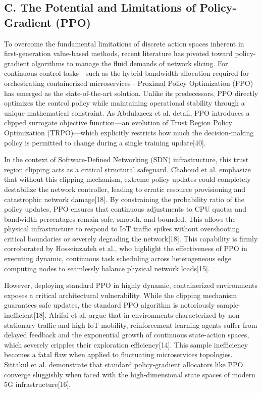 \subsection{C. The Potential and Limitations of Policy-Gradient (PPO)}\label{c.-the-potential-and-limitations-of-policy-gradient-ppo}

To overcome the fundamental limitations of discrete action spaces inherent in first-generation value-based methods, recent literature has pivoted toward policy-gradient algorithms to manage the fluid demands of network slicing. For continuous control tasks---such as the hybrid bandwidth allocation required for orchestrating containerized microservices---Proximal Policy Optimization (PPO) has emerged as the state-of-the-art solution. Unlike its predecessors, PPO directly optimizes the control policy while maintaining operational stability through a unique mathematical constraint. As Abdulazeez et al. detail, PPO introduces a clipped surrogate objective function---an evolution of Trust Region Policy Optimization (TRPO)---which explicitly restricts how much the decision-making policy is permitted to change during a single training update{[}40{]}.

In the context of Software-Defined Networking (SDN) infrastructure, this trust region clipping acts as a critical structural safeguard. Chahoud et al. emphasize that without this clipping mechanism, extreme policy updates could completely destabilize the network controller, leading to erratic resource provisioning and catastrophic network damage{[}18{]}. By constraining the probability ratio of the policy updates, PPO ensures that continuous adjustments to CPU quotas and bandwidth percentages remain safe, smooth, and bounded. This allows the physical infrastructure to respond to IoT traffic spikes without overshooting critical boundaries or severely degrading the network{[}18{]}. This capability is firmly corroborated by Hosseinzadeh et al., who highlight the effectiveness of PPO in executing dynamic, continuous task scheduling across heterogeneous edge computing nodes to seamlessly balance physical network loads{[}15{]}.

However, deploying standard PPO in highly dynamic, containerized environments exposes a critical architectural vulnerability. While the clipping mechanism guarantees safe updates, the standard PPO algorithm is notoriously sample-inefficient{[}18{]}. Alrifai et al. argue that in environments characterized by non-stationary traffic and high IoT mobility, reinforcement learning agents suffer from delayed feedback and the exponential growth of continuous state-action spaces, which severely cripples their exploration efficiency{[}14{]}. This sample inefficiency becomes a fatal flaw when applied to fluctuating microservices topologies. Sittakul et al. demonstrate that standard policy-gradient allocators like PPO converge sluggishly when faced with the high-dimensional state spaces of modern 5G infrastructure{[}16{]}.

